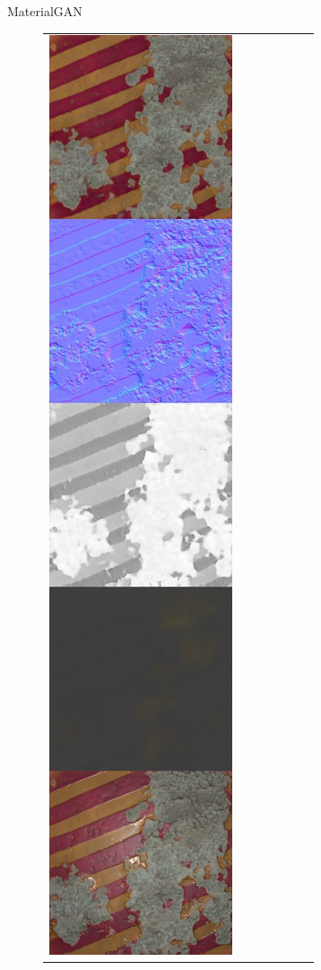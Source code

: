 \documentclass[final]{beamer}
\newlength{\twocolwid}
\newlength{\resLen}
\begin{document}
\begin{frame}[t]
\begin{columns}[t]
\begin{column}{\twocolwid}
\begin{block}{MaterialGAN}
\begin{figure}
\begin{tabular}{ccccccc}
					\includegraphics[width=\resLen]{others/matgan/19.jpg}
				\end{tabular}
			\end{figure}
		

\end{block}
\end{column}
\end{columns}
\end{frame}
\end{document}
